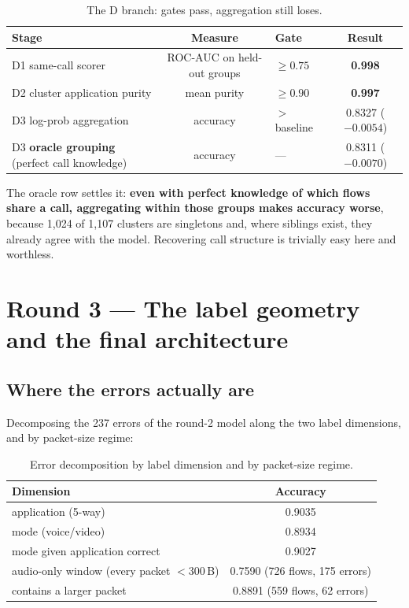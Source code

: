\documentclass[11pt]{article}
\begin{document}
\begin{table}[htbp]
\centering\small
\caption{The D branch: gates pass, aggregation still loses.}
\label{tab:dbranch}
\begin{tabular}{lclc}
\toprule
Stage & Measure & Gate & Result \\
\midrule
D1 same-call scorer & ROC-AUC on held-out groups & $\geq 0.75$ & \textbf{0.998} \\
D2 cluster application purity & mean purity & $\geq 0.90$ & \textbf{0.997} \\
D3 log-prob aggregation & accuracy & $>$ baseline & 0.8327 ($-0.0054$) \\
D3 \textbf{oracle grouping} (perfect call knowledge) & accuracy & --- & 0.8311 ($-0.0070$) \\
\bottomrule
\end{tabular}
\end{table}

The oracle row settles it: \textbf{even with perfect knowledge of which flows share a call, aggregating
within those groups makes accuracy worse}, because 1{,}024 of 1{,}107 clusters are singletons and, where
siblings exist, they already agree with the model. Recovering call structure is trivially easy here and
worthless.

\section{Round 3 --- The label geometry and the final architecture}
\label{sec:round3}

\subsection{Where the errors actually are}

Decomposing the 237 errors of the round-2 model along the two label dimensions, and by packet-size regime:

\begin{table}[htbp]
\centering\small
\caption{Error decomposition by label dimension and by packet-size regime.}
\label{tab:errors}
\begin{tabular}{lc}
\toprule
Dimension & Accuracy \\
\midrule
application (5-way) & 0.9035 \\
mode (voice/video) & 0.8934 \\
mode given application correct & 0.9027 \\
\midrule
audio-only window (every packet $<300$\,B) & 0.7590 (726 flows, 175 errors) \\
contains a larger packet & 0.8891 (559 flows, 62 errors) \\
\bottomrule
\end{tabular}
\end{table}
\end{document}
